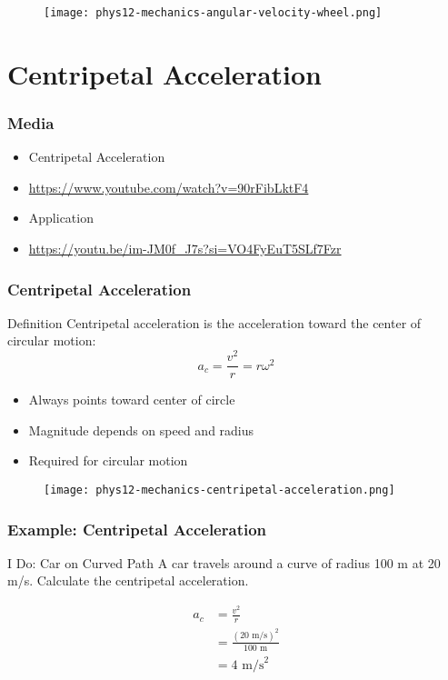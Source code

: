 \documentclass{beamer}
\begin{document}
\begin{frame}
\begin{figure}
    \centering
    \texttt{[image: phys12-mechanics-angular-velocity-wheel.png]}
\end{figure}
\end{frame}

\section{Centripetal Acceleration}

\begin{frame}
\frametitle{Media}
     \begin{itemize}
  \item Centripetal Acceleration
  \item \hyperlink{https://www.youtube.com/watch?v=90rFibLktF4}{https://www.youtube.com/watch?v=90rFibLktF4}
  \item Application
  \item \hyperlink{https://youtu.be/im-JM0f_J7s?si=VO4FyEuT5SLf7Fzr}{https://youtu.be/im-JM0f_J7s?si=VO4FyEuT5SLf7Fzr}
  \end{itemize}
\end{frame}

\begin{frame}
\frametitle{Centripetal Acceleration}
\begin{block}{Definition}
Centripetal acceleration is the acceleration toward the center of circular motion:
\[ a_c = \frac{v^2}{r} = r\omega^2 \]
\end{block}
\begin{itemize}
\item Always points toward center of circle
\item Magnitude depends on speed and radius
\item Required for circular motion
\end{itemize}
\end{frame}

\begin{frame}
\begin{figure}
    \centering
    \texttt{[image: phys12-mechanics-centripetal-acceleration.png]}
\end{figure}
\end{frame}

\begin{frame}
\frametitle{Example: Centripetal Acceleration}
\begin{block}{I Do: Car on Curved Path}
A car travels around a curve of radius 100 m at 20 m/s.
Calculate the centripetal acceleration.
\end{block}
\begin{align*}
a_c &= \frac{v^2}{r} \\
&= \frac{(20\text{ m/s})^2}{100\text{ m}} \\
&= 4\text{ m/s}^2
\end{align*}
\end{frame}
\end{document}
